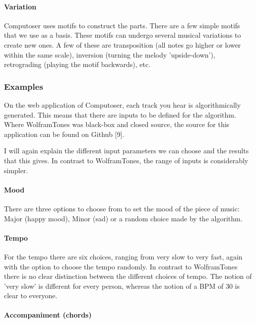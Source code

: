\documentclass[12pt]{article}
\begin{document}
\paragraph{Variation} Computoser uses motifs to construct the parts. There are a few simple motifs that we use as a basis. These motifs can undergo several musical variations to create new ones. A few of these are transposition (all notes go higher or lower within the same scale), inversion (turning the melody 'upside-down'), retrograding (playing the motif backwards), etc.

\subsubsection{Examples}

On the web application of Computoser, each track you hear is algorithmically generated. This means that there are inputs to be defined for the algorithm. Where WolframTones was black-box and closed source, the source for this application can be found on Github [9].
\newline

I will again explain the different input parameters we can choose and the results that this gives. In contrast to WolframTones, the range of inputs is considerably simpler. 

\paragraph{Mood}

There are three options to choose from to set the mood of the piece of music: Major (happy mood), Minor (sad) or a random choice made by the algorithm.

\paragraph{Tempo}

For the tempo there are six choices, ranging from very slow to very fast, again with the option to choose the tempo randomly. In contrast to WolframTones there is no clear distinction between the different choices of tempo. The notion of 'very slow' is different for every person, whereas the notion of a BPM of 30 is clear to everyone.

\paragraph{Accompaniment (chords)}
\end{document}

